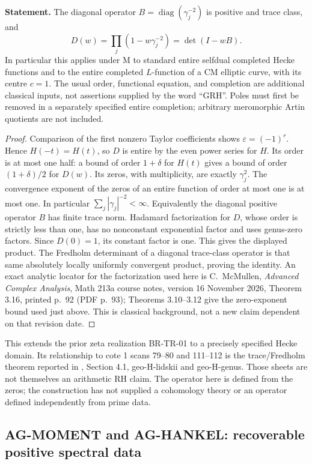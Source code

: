 \documentclass[11pt,a4paper]{article}
\begin{document}
\textbf{Statement.} The diagonal operator
$B=\operatorname{diag}(\gamma_j^{-2})$ is positive and trace class, and
\[
 D(w)=\prod_j(1-w\gamma_j^{-2})=\det(I-wB).
\]
In particular this applies under M to standard entire selfdual completed
Hecke functions and to the entire completed $L$-function of a CM elliptic
curve, with its centre $c=1$. The usual order, functional equation,
and completion are additional classical inputs, not assertions supplied
by the word ``GRH''. Poles must first be removed in a separately specified
entire completion; arbitrary meromorphic Artin quotients are not included.

\begin{proof}
Comparison of the first nonzero Taylor coefficients shows
$\varepsilon=(-1)^r$. Hence $H(-t)=H(t)$, so $D$ is entire by the even
power series for $H$. Its order is at most one half: a bound of order
$1+\delta$ for $H(t)$ gives a bound of order $(1+\delta)/2$ for $D(w)$.
Its zeros, with multiplicity, are exactly $\gamma_j^2$.
The convergence exponent of the zeros of an entire function of order at
most one is at most one. In particular
$\sum_j|\gamma_j|^{-2}<\infty$. Equivalently the diagonal positive
operator $B$ has finite trace norm. Hadamard factorization for $D$, whose
order is strictly less than one, has no nonconstant exponential factor
and uses genus-zero factors. Since $D(0)=1$, its constant factor is one.
This gives the displayed product. The Fredholm determinant of a diagonal
trace-class operator is that same absolutely locally uniformly convergent
product, proving the identity. An exact analytic locator for the
factorization used here is C.~McMullen, \emph{Advanced Complex Analysis},
Math 213a course notes, version 16 November 2026, Theorem 3.16,
printed p.~92 (PDF p.~93); Theorems 3.10--3.12 give the zero-exponent
bound used just above. This is classical background, not a new claim
dependent on that revision date.
\end{proof}

This extends the prior zeta realization BR-TR-01 to a precisely specified
Hecke domain. Its relationship to cote 1 scans 79--80 and 111--112 is
the trace/Fredholm theorem reported in
, Section 4.1,
geo-H-lidskii and geo-H-genus. Those sheets are not themselves an
arithmetic RH claim. The operator here is defined from the zeros; the
construction has not supplied a cohomology theory or an operator defined
independently from prime data.

\subsection{AG-MOMENT and AG-HANKEL: recoverable positive spectral data}
\label{ag:moment}
\end{document}
